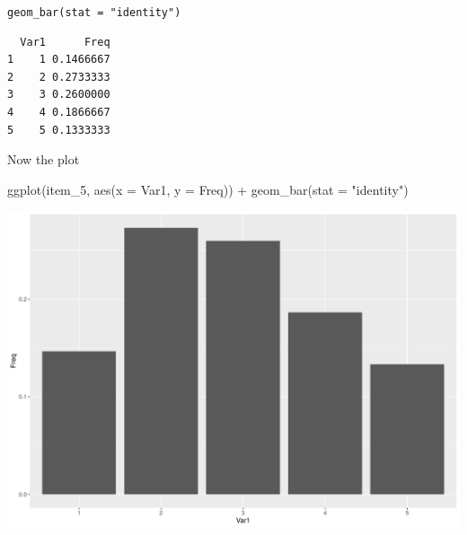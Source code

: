 \documentclass[
  ignorenonframetext,
]{beamer}
\newenvironment{Shaded}{\begin{snugshade}}{\end{snugshade}}
\newcommand{\AttributeTok}[1]{\textcolor[rgb]{0.00,0.34,0.68}{#1}}
\newcommand{\FunctionTok}[1]{\textcolor[rgb]{0.39,0.29,0.61}{#1}}
\newcommand{\NormalTok}[1]{\textcolor[rgb]{0.12,0.11,0.11}{#1}}
\newcommand{\OtherTok}[1]{\textcolor[rgb]{0.00,0.43,0.16}{#1}}
\newcommand{\SpecialCharTok}[1]{\textcolor[rgb]{0.24,0.68,0.91}{#1}}
\newcommand{\StringTok}[1]{\textcolor[rgb]{0.75,0.01,0.01}{#1}}
\begin{document}
\begin{frame}[fragile]{\texttt{geom\_bar(stat\ =\ "identity")}}
\protect\hypertarget{geom_barstat-identity}{}
\footnotesize

\begin{Shaded}
\end{Shaded}

\begin{verbatim}
  Var1      Freq
1    1 0.1466667
2    2 0.2733333
3    3 0.2600000
4    4 0.1866667
5    5 0.1333333
\end{verbatim}
\end{frame}

\begin{frame}[fragile]{Now the plot}
\protect\hypertarget{now-the-plot}{}
\begin{Shaded}
\begin{Highlighting}[]
\FunctionTok{ggplot}\NormalTok{(item\_5, }
       \FunctionTok{aes}\NormalTok{(}\AttributeTok{x =}\NormalTok{ Var1, }\AttributeTok{y =}\NormalTok{ Freq)) }\SpecialCharTok{+} \FunctionTok{geom\_bar}\NormalTok{(}\AttributeTok{stat =} \StringTok{"identity"}\NormalTok{)}
\end{Highlighting}
\end{Shaded}

\begin{center}\includegraphics[width=0.7\linewidth]{Practice_files/figure-beamer/unnamed-chunk-81-1} \end{center}
\end{frame}
\end{document}
